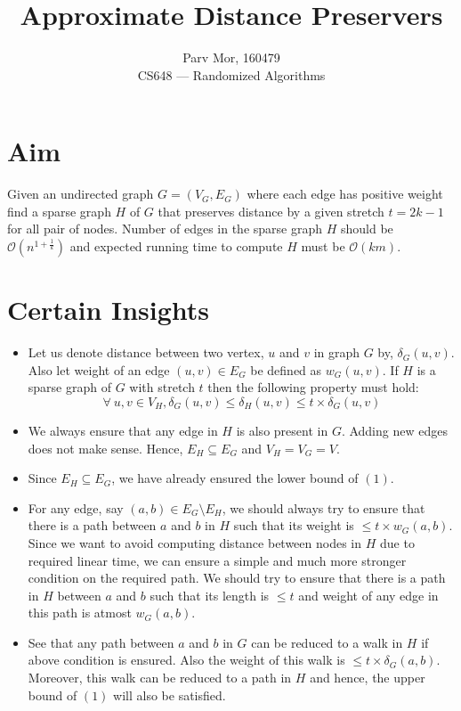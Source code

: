 \documentclass[12pt]{article}
\begin{document}
\title{Approximate Distance Preservers}
\author{Parv Mor, 160479\\ CS648 --- Randomized Algorithms}
\maketitle

\section{Aim}
Given an undirected graph $G = (V_G, E_G)$ where each edge has positive weight find a sparse graph $H$ of $G$ that preserves distance by a given stretch $t = 2k - 1$ for all pair of nodes. Number of edges in the sparse graph $H$ should be $\mathcal{O}(n^{1 + \frac{1}{k}})$ and expected running time to compute $H$ must be $\mathcal{O}(km)$.

\section{Certain Insights}
\begin{itemize}
  \item
  Let us denote distance between two vertex, $u$ and $v$ in graph $G$ by, $\delta_G(u, v)$. Also let weight of an edge $(u, v) \in E_G$ be defined as $w_G(u, v)$. If $H$ is a sparse graph of $G$ with stretch $t$ then the following property must hold:
  \begin{equation} \forall\ u, v \in V_H, \delta_G(u, v) \leq \delta_H(u, v) \leq t \times \delta_G(u, v) \end{equation}
  \item
  We always ensure that any edge in $H$ is also present in $G$. Adding new edges does not make sense. Hence, $E_H \subseteq E_G$ and $V_H = V_G = V$.
  \item
  Since $E_H \subseteq E_G$, we have already ensured the lower bound of $(1)$.
  \item
  For any edge, say $(a, b) \in E_G \setminus E_H$,  we should always try to ensure that there is a path between $a$ and $b$ in $H$ such that its weight is $\leq t \times w_G(a, b)$. Since we want to avoid computing distance between nodes in $H$ due to required linear time, we can ensure a simple and much more stronger condition on the required path. We should try to ensure that there is a path in $H$ between $a$ and $b$ such that its length is $\leq t$ and weight of any edge in this path is atmost $w_G(a, b)$.
  \item
  See that any path between $a$ and $ b$ in $G$ can be reduced to a walk in $H$ if above condition is ensured. Also the weight of this walk is $\leq t \times \delta_G(a, b)$. Moreover, this walk can be reduced to a path in $H$ and hence, the upper bound of $(1)$ will also be satisfied.
\end{itemize}
\end{document}
